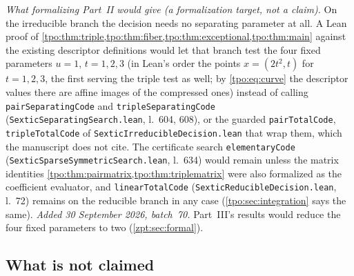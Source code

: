 \documentclass[11pt,letterpaper]{article}
\numberwithin{equation}{section}
\theoremstyle{definition}
\theoremstyle{remark}
\newcommand{\src}[1]{\texttt{\nolinkurl{#1}}}
\begin{document}
\emph{What formalizing Part~II would give (a formalization target, not a
claim).} On the irreducible branch the decision needs no separating
parameter at all. A Lean proof of \cref{tpo:thm:triple,tpo:thm:fiber,tpo:thm:exceptional,tpo:thm:main}
against the existing descriptor definitions would let that branch test the
four fixed parameters $u=1$, $t=1,2,3$ (in Lean's order the points
$x=(2t^2,t)$ for $t=1,2,3$, the first serving the triple test as well; by
\eqref{tpo:eq:curve} the descriptor values there are affine images of the
compressed ones) instead of
calling \src{pairSeparatingCode} and \src{tripleSeparatingCode}
(\src{SexticSeparatingSearch.lean}, l.~604, 608), or the guarded
\src{pairTotalCode}, \src{tripleTotalCode} of
\src{SexticIrreducibleDecision.lean} that wrap them, which the manuscript
does not cite. The certificate search \src{elementaryCode}
(\src{SexticSparseSymmetricSearch.lean}, l.~634) would remain unless the
matrix identities \cref{tpo:thm:pairmatrix,tpo:thm:triplematrix} were also
formalized as the coefficient evaluator, and \src{linearTotalCode}
(\src{SexticReducibleDecision.lean}, l.~72) remains on the reducible
branch in any case (\cref{tpo:sec:integration} says the same).
\emph{Added 30 September 2026, batch~70.} Part~III's results would reduce
the four fixed parameters to two (\cref{zpt:sec:formal}).

\subsection{What is not claimed}
\label{tpo:sec:nonclaims}
\end{document}
